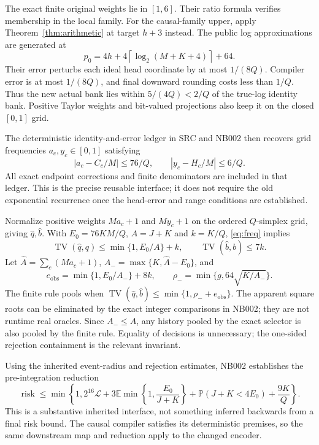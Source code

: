 \documentclass[11pt,letterpaper]{article}
\theoremstyle{definition}\newtheorem{definition}[theorem]{Definition}
\theoremstyle{remark}\newtheorem{remark}[theorem]{Remark}
\newcommand{\TV}{\operatorname{TV}}
\newcommand{\E}{\mathbb{E}}
\newcommand{\Prob}{\mathbb{P}}
\newcommand{\ceil}[1]{\left\lceil #1\right\rceil}
\newcommand{\unit}[1]{\textsf{#1}}
\begin{document}
The exact finite original weights lie in $[1,6]$. Their ratio formula verifies membership in the local family. For the causal-family upper, apply Theorem~\ref{thm:arithmetic} at target $h+3$ instead. The public log approximations are generated at
\[
 p_0=4h+4\ceil{\log_2(M+K+4)}+64.
\]
Their error perturbs each ideal head coordinate by at most $1/(8Q)$. Compiler error is at most $1/(8Q)$, and final downward rounding costs less than $1/Q$. Thus the new actual bank lies within $5/(4Q)<2/Q$ of the true-log identity bank. Positive Taylor weights and bit-valued projections also keep it on the closed $[0,1]$ grid.

The deterministic identity-and-error ledger in \unit{SRC} and \unit{NB002} then recovers grid frequencies $a_c,y_c\in[0,1]$ satisfying
\begin{equation}\label{eq:freq}
 |a_c-C_c/M|\le76/Q,\qquad |y_c-H_c/M|\le6/Q.
\end{equation}
All exact endpoint corrections and finite denominators are included in that ledger. This is the precise reusable interface; it does not require the old exponential recurrence once the head-error and range conditions are established.

Normalize positive weights $Ma_c+1$ and $My_c+1$ on the ordered $Q$-simplex grid, giving $\widehat q,\widehat b$. With $E_0=76KM/Q$, $A=J+K$ and $k=K/Q$, \eqref{eq:freq} implies
\[
 \TV(\widehat q,q)\le\min\{1,E_0/A\}+k,\qquad
 \TV(\widehat b,b)\le7k.
\]
Let $\widehat A=\sum_c(Ma_c+1)$, $A_-=\max\{K,\widehat A-E_0\}$, and
\[
 e_{\mathrm{obs}}=\min\{1,E_0/A_-\}+8k,\qquad
 \rho_-=\min\{g,64\sqrt{K/A_-}\}.
\]
The finite rule pools when $\TV(\widehat q,\widehat b)\le\min\{1,\rho_-+e_{\mathrm{obs}}\}$. The apparent square roots can be eliminated by the exact integer comparisons in \unit{NB002}; they are not runtime real oracles. Since $A_-\le A$, any history pooled by the exact selector is also pooled by the finite rule. Equality of decisions is unnecessary; the one-sided rejection containment is the relevant invariant.

Using the inherited event-radius and rejection estimates, \unit{NB002} establishes the pre-integration reduction
\begin{equation}\label{eq:preint}
 \operatorname{risk}\le\min\left\{1,2^{16}\mathcal L+
 3\E\min\left\{1,\frac{E_0}{J+K}\right\}
 +\Prob(J+K<4E_0)+\frac{9K}{Q}\right\}.
\end{equation}
This is a substantive inherited interface, not something inferred backwards from a final risk bound. The causal compiler satisfies its deterministic premises, so the same downstream map and reduction apply to the changed encoder.
\end{document}
